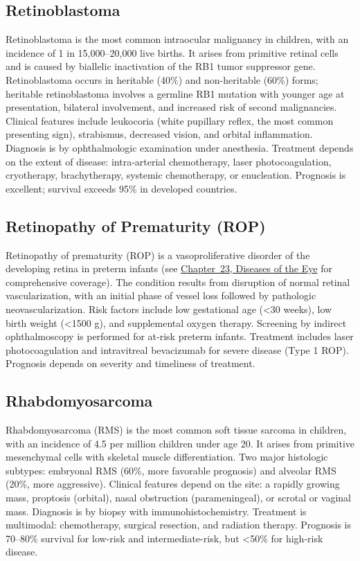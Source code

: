 \subsection{Retinoblastoma}
\label{sec:Retinoblastoma}
Retinoblastoma is the most common intraocular malignancy in children, with an incidence of 1 in 15,000--20,000 live births. It arises from primitive retinal cells and is caused by biallelic inactivation of the RB1 tumor suppressor gene. Retinoblastoma occurs in heritable (40\%) and non-heritable (60\%) forms; heritable retinoblastoma involves a germline RB1 mutation with younger age at presentation, bilateral involvement, and increased risk of second malignancies. Clinical features include leukocoria (white pupillary reflex, the most common presenting sign), strabismus, decreased vision, and orbital inflammation. Diagnosis is by ophthalmologic examination under anesthesia. Treatment depends on the extent of disease: intra-arterial chemotherapy, laser photocoagulation, cryotherapy, brachytherapy, systemic chemotherapy, or enucleation. Prognosis is excellent; survival exceeds 95\% in developed countries.

\subsection{Retinopathy of Prematurity (ROP)}
\label{sec:pediatric:Retinopathy of Prematurity}
Retinopathy of prematurity (ROP) is a vasoproliferative disorder of the developing retina in preterm infants (see \hyperref[ch:eyes]{Chapter~23, Diseases of the Eye} for comprehensive coverage). The condition results from disruption of normal retinal vascularization, with an initial phase of vessel loss followed by pathologic neovascularization. Risk factors include low gestational age (<30 weeks), low birth weight (<1500 g), and supplemental oxygen therapy. Screening by indirect ophthalmoscopy is performed for at-risk preterm infants. Treatment includes laser photocoagulation and intravitreal bevacizumab for severe disease (Type 1 ROP). Prognosis depends on severity and timeliness of treatment.

\subsection{Rhabdomyosarcoma}
\label{sec:Rhabdomyosarcoma}
Rhabdomyosarcoma (RMS) is the most common soft tissue sarcoma in children, with an incidence of 4.5 per million children under age 20. It arises from primitive mesenchymal cells with skeletal muscle differentiation. Two major histologic subtypes: embryonal RMS (60\%, more favorable prognosis) and alveolar RMS (20\%, more aggressive). Clinical features depend on the site: a rapidly growing mass, proptosis (orbital), nasal obstruction (parameningeal), or scrotal or vaginal mass. Diagnosis is by biopsy with immunohistochemistry. Treatment is multimodal: chemotherapy, surgical resection, and radiation therapy. Prognosis is 70--80\% survival for low-risk and intermediate-risk, but <50\% for high-risk disease.


